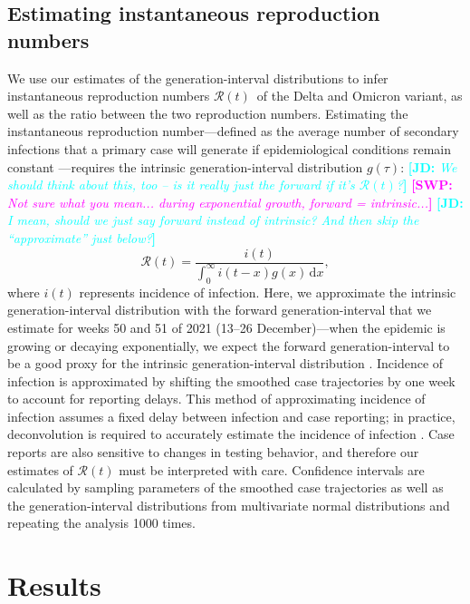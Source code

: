\documentclass[12pt]{article}
\newcommand{\comment}{\showcomment}
\newcommand{\showcomment}[3]{\textcolor{#1}{\textbf{[#2: }\textsl{#3}\textbf{]}}}
\newcommand{\jd}[1]{\comment{cyan}{JD}{#1}}
\newcommand{\swp}[1]{\comment{magenta}{SWP}{#1}}
\newcommand{\Rt}{\ensuremath{{\mathcal R}(t)}\xspace}
\newcommand{\dd}[1]{\ensuremath{\, \mathrm{d}#1}}
\newcommand{\dx}{\dd{x}}
\begin{document}
\subsection{Estimating instantaneous reproduction numbers}

We use our estimates of the generation-interval distributions to infer instantaneous reproduction numbers \Rt\ of the Delta and Omicron variant, as well as the ratio between the two reproduction numbers.
Estimating the instantaneous reproduction number---defined as the average number of secondary infections that a primary case will generate if epidemiological conditions remain constant \citep{fraser2007estimating}---requires the intrinsic generation-interval distribution $g(\tau)$:
\jd{We should think about this, too -- is it really just the forward if it's \Rt?}
\swp{Not sure what you mean... during exponential growth, forward = intrinsic...}
\jd{I mean, should we just say forward instead of intrinsic? And then skip the ``approximate'' just below?}
\begin{equation}
\Rt = \frac{i(t)}{\int_0^\infty i(t-x) g(x) \dx},
\end{equation}
where $i(t)$ represents incidence of infection.
Here, we approximate the intrinsic generation-interval distribution with the forward generation-interval that we estimate for weeks 50 and 51 of 2021 (13--26 December)---when the epidemic is growing or decaying exponentially, we expect the forward generation-interval to be a good proxy for the intrinsic generation-interval distribution \citep{champredon2015intrinsic, park2020inferring}.
Incidence of infection is approximated by shifting the smoothed case trajectories by one week to account for reporting delays.
This method of approximating incidence of infection assumes a fixed delay between infection and case reporting;
in practice, deconvolution is required to accurately estimate the incidence of infection \citep{goldstein2009reconstructing}.
Case reports are also sensitive to changes in testing behavior, and therefore our estimates of $\Rt$ must be interpreted with care.
Confidence intervals are calculated by sampling parameters of the smoothed case trajectories as well as the generation-interval distributions from multivariate normal distributions and repeating the analysis 1000 times.

\section{Results}
\end{document}
